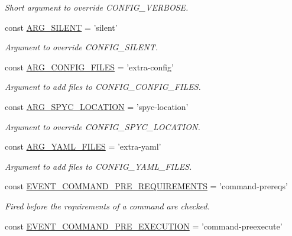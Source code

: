 \begin{DoxyCompactItemize}
\begin{DoxyCompactList}\small\item\em Short argument to override C\-O\-N\-F\-I\-G\-\_\-\-V\-E\-R\-B\-O\-S\-E. \end{DoxyCompactList}\item 
const \hyperlink{group__args_gafd7c5af186098f8c54f92f6a0f5ff23c}{A\-R\-G\-\_\-\-S\-I\-L\-E\-N\-T} = 'silent'
\begin{DoxyCompactList}\small\item\em Argument to override C\-O\-N\-F\-I\-G\-\_\-\-S\-I\-L\-E\-N\-T. \end{DoxyCompactList}\item 
const \hyperlink{group__args_ga87849d19fd64c989a9562207edb3d6f5}{A\-R\-G\-\_\-\-C\-O\-N\-F\-I\-G\-\_\-\-F\-I\-L\-E\-S} = 'extra-\/config'
\begin{DoxyCompactList}\small\item\em Argument to add files to C\-O\-N\-F\-I\-G\-\_\-\-C\-O\-N\-F\-I\-G\-\_\-\-F\-I\-L\-E\-S. \end{DoxyCompactList}\item 
const \hyperlink{group__args_ga73d8fbeb725231563d894795457b1adf}{A\-R\-G\-\_\-\-S\-P\-Y\-C\-\_\-\-L\-O\-C\-A\-T\-I\-O\-N} = 'spyc-\/location'
\begin{DoxyCompactList}\small\item\em Argument to override C\-O\-N\-F\-I\-G\-\_\-\-S\-P\-Y\-C\-\_\-\-L\-O\-C\-A\-T\-I\-O\-N. \end{DoxyCompactList}\item 
const \hyperlink{group__args_ga17328c6a748e7ced71ea6ed9b0107742}{A\-R\-G\-\_\-\-Y\-A\-M\-L\-\_\-\-F\-I\-L\-E\-S} = 'extra-\/yaml'
\begin{DoxyCompactList}\small\item\em Argument to add files to C\-O\-N\-F\-I\-G\-\_\-\-Y\-A\-M\-L\-\_\-\-F\-I\-L\-E\-S. \end{DoxyCompactList}\item 
const \hyperlink{group__events_gac0e1fb5341f5e15a436958b5176678b0}{E\-V\-E\-N\-T\-\_\-\-C\-O\-M\-M\-A\-N\-D\-\_\-\-P\-R\-E\-\_\-\-R\-E\-Q\-U\-I\-R\-E\-M\-E\-N\-T\-S} = 'command-\/prereqs'
\begin{DoxyCompactList}\small\item\em Fired before the requirements of a command are checked. \end{DoxyCompactList}\item 
const \hyperlink{group__events_gabe685755de0eb3af1e1853138eed399e}{E\-V\-E\-N\-T\-\_\-\-C\-O\-M\-M\-A\-N\-D\-\_\-\-P\-R\-E\-\_\-\-E\-X\-E\-C\-U\-T\-I\-O\-N} = 'command-\/preexecute'

\end{DoxyCompactItemize}
